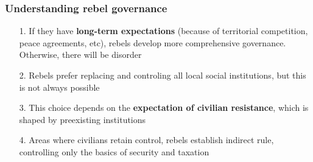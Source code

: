 \documentclass[aspectratio=43]{beamer}
\begin{document}
\begin{frame}
\frametitle{Understanding rebel governance}
\centering

  \begin{itemize}[<+->]
    \item[1.] If they have \textbf{long-term expectations} (because of territorial competition, peace agreements, etc), rebels develop more comprehensive governance. Otherwise, there will be disorder
    \item[2.] Rebels prefer replacing and controling all local social institutions, but this is not always possible
    \item[3.] This choice depends on the \textbf{expectation of civilian resistance}, which is shaped by preexisting institutions
    \item[4.] Areas where civilians retain control, rebels establish indirect rule, controlling only the basics of security and taxation
  \end{itemize}


\end{frame}
\end{document}

